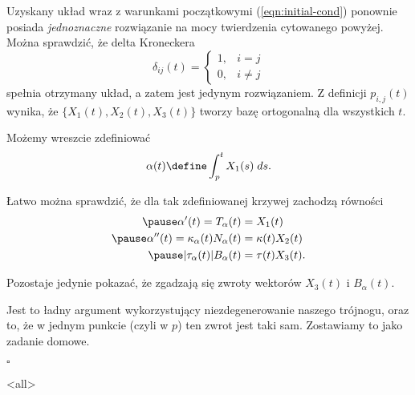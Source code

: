 \begin{frame}[<+->]
Uzyskany układ wraz z warunkami początkowymi (\ref{eqn:initial-cond}) ponownie posiada \textit{jednoznaczne} rozwiązanie na mocy twierdzenia cytowanego powyżej. \pause Można sprawdzić, że delta Kroneckera 
\[\delta_{ij}(t)=\begin{cases}
            1,&i=j\\
	0, & i\neq j
            \end{cases}\]
spełnia otrzymany układ, a zatem jest jedynym rozwiązaniem. \pause Z definicji $p_{i,j}(t)$ wynika, że $\{X_1(t),X_2(t),X_3(t)\}$ tworzy bazę ortogonalną dla wszystkich $t$.

\pause Możemy wreszcie zdefiniować 
\[\alpha(t)\define\int_p^t X_1(s)\;ds.\]

\end{frame}
\begin{frame}[<+->]

Łatwo można sprawdzić, że dla tak zdefiniowanej krzywej zachodzą równości
\begin{align*}
\pause \alpha'(t)=T_\alpha(t)& =X_1(t)\\
\pause \alpha''(t)=\kappa_\alpha(t)N_\alpha(t)&=\kappa(t) X_2(t)\\
\pause |\tau_\alpha(t)|B_\alpha(t)&=\tau(t) X_3(t).
\end{align*}

\pause Pozostaje jedynie pokazać, że zgadzają się zwroty wektorów $X_3(t)$ i $B_\alpha(t)$. 

\footnotesize
\pause Jest to ładny argument wykorzystujący niezdegenerowanie naszego trójnogu, oraz to, że w jednym punkcie (czyli w $p$) ten zwrot jest taki sam. Zostawiamy to jako zadanie domowe.

\normalsize
\hfill $\square$
\end{frame}
% 
% 

\mode<all> 
